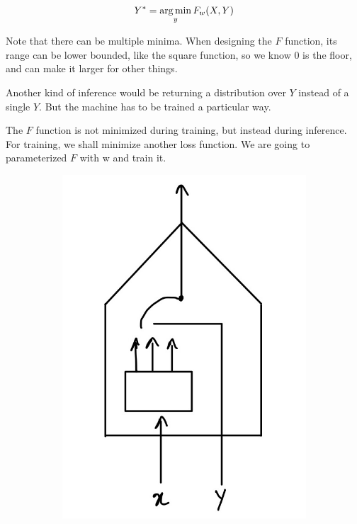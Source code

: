 \begin{equation*}
    Y^* = \argmin_y F_w (X,Y)
\end{equation*}

Note that there can be multiple minima.
When designing the $F$ function, its range can be lower bounded, like the square function, so we know 0 is the floor, and can make it larger for other things. 

Another kind of inference would be returning a distribution over $Y$ instead of a single $Y$. But the machine has to be trained a particular way.

The $F$ function is not minimized during training, but instead during inference. 
For training, we shall minimize another loss function. We are going to parameterized $F$ with w and train it.


\begin{figure}[htb]
    \centering
    \begin{subfigure}[b]{0.2\textwidth}
        \includegraphics[width=\textwidth]{figs/EBM6-2.jpg}

\end{subfigure}
\end{figure}
